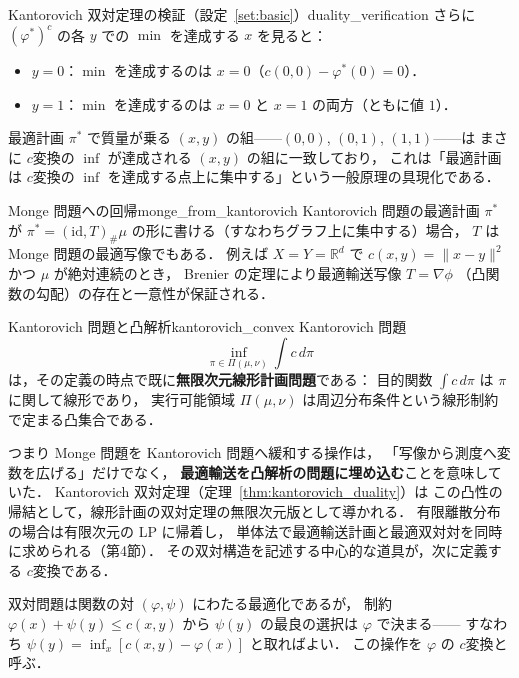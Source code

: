 \documentclass[uplatex, dvipdfmx]{jsarticle}
\begin{document}
\begin{example}{Kantorovich 双対定理の検証（設定~\ref{set:basic}）}{duality_verification}
さらに $(\varphi^*)^c$ の各 $y$ での $\min$ を達成する $x$ を見ると：
\begin{itemize}
  \item $y=0$：$\min$ を達成するのは $x=0$（$c(0,0)-\varphi^*(0)=0$）．
  \item $y=1$：$\min$ を達成するのは $x=0$ と $x=1$ の両方（ともに値 $1$）．
\end{itemize}
最適計画 $\pi^*$ で質量が乗る $(x,y)$ の組——$(0,0)$, $(0,1)$, $(1,1)$——は
まさに $c$変換の $\inf$ が達成される $(x,y)$ の組に一致しており，
これは「最適計画は $c$変換の $\inf$ を達成する点上に集中する」という一般原理の具現化である．
\end{example}

\begin{remark}{Monge 問題への回帰}{monge_from_kantorovich}
Kantorovich 問題の最適計画 $\pi^*$ が
$\pi^*=(\mathrm{id},T)_\#\mu$ の形に書ける（すなわちグラフ上に集中する）場合，
$T$ は Monge 問題の最適写像でもある．
例えば $X=Y=\mathbb{R}^d$ で $c(x,y)=\|x-y\|^2$ かつ $\mu$ が絶対連続のとき，
Brenier の定理により最適輸送写像 $T=\nabla\phi$
（凸関数の勾配）の存在と一意性が保証される．
\end{remark}


\begin{remark}{Kantorovich 問題と凸解析}{kantorovich_convex}
Kantorovich 問題
\[
  \inf_{\pi\in\Pi(\mu,\nu)}\int c\,d\pi
\]
は，その定義の時点で既に\textbf{無限次元線形計画問題}である：
目的関数 $\int c\,d\pi$ は $\pi$ に関して線形であり，
実行可能領域 $\Pi(\mu,\nu)$ は周辺分布条件という線形制約で定まる凸集合である．

つまり Monge 問題を Kantorovich 問題へ緩和する操作は，
「写像から測度へ変数を広げる」だけでなく，
\textbf{最適輸送を凸解析の問題に埋め込む}ことを意味していた．
Kantorovich 双対定理（定理~\ref{thm:kantorovich_duality}）は
この凸性の帰結として，線形計画の双対定理の無限次元版として導かれる．
有限離散分布の場合は有限次元の LP に帰着し，
単体法で最適輸送計画と最適双対対を同時に求められる（第4節）．
その双対構造を記述する中心的な道具が，次に定義する $c$変換である．
\end{remark}

双対問題は関数の対 $(\varphi,\psi)$ にわたる最適化であるが，
制約 $\varphi(x)+\psi(y)\le c(x,y)$ から
$\psi(y)$ の最良の選択は $\varphi$ で決まる——
すなわち $\psi(y)=\inf_x[c(x,y)-\varphi(x)]$ と取ればよい．
この操作を $\varphi$ の $c$変換と呼ぶ．
\end{document}
